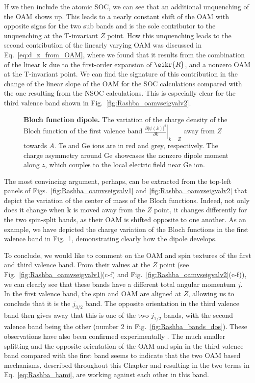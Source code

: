If we then include the atomic \gls{SOC}, we can see that an additional unquenching of the \gls{OAM} shows up.
This leads to a nearly constant shift of the \gls{OAM} with opposite signs for the two sub bands and is the sole contributor to the unquenching at the \gls{T}-invariant $Z$ point.
How this unquenching leads to the second contribution of the linearly varying \gls{OAM} was discussed in Eq.~\eqref{eq:d_z_from_OAM}, where we found that it results from the combination of the linear $\bm k$ due to the first-order expansion of $\eikr{R}$, and a nonzero \gls{OAM} at the \gls{T}-invariant point.
We can find the signature of this contribution in the change of the linear slope of the \gls{OAM} for the \gls{SOC} calculations compared with the one resulting from the \gls{NSOC} calculations.
This is especially clear for the third valence band shown in Fig.~\ref{fig:Rashba_oamvseigvalv2}.
\begin{figure}
	\centering
{}
\caption{\label{fig:Rashba_diffdens}{\bf Bloch function dipole.} The variation of the charge density of the Bloch function of the first valence band $\left.\frac{\partial |\psi(k)|^2}{\partial k}\right\rvert_{k=Z}$ away from $Z$ towards $A$. Te and Ge ions are in red and grey, respectively. The charge asymmetry around Ge showcases the nonzero dipole moment along $z$, which couples to the local electric field near Ge ion.}
\end{figure}
    
The most convincing argument, perhaps, can be extracted from the top-left panels of Figs.~\ref{fig:Rashba_oamvseigvalv1} and \ref{fig:Rashba_oamvseigvalv2} that depict the variation of the center of mass of the Bloch functions. Indeed, not only does it change when $\bm k$ is moved away from the $Z$ point, it changes differently for the two spin-split bands, as their \gls{OAM} is shifted opposite to one another.
As an example,  we have depicted the charge variation of the Bloch functions in the first valence band in Fig.~\ref{fig:Rashba_diffdens}, demonstrating clearly how the dipole develops.
    
To conclude, we would like to comment on the \gls{OAM} and spin textures of the first and third valence band.
From their values at the $Z$ point (see Fig.~\ref{fig:Rashba_oamvseigvalv1}(c-f) and Fig.~\ref{fig:Rashba_oamvseigvalv2}(c-f)), we can clearly see that these bands have a different total angular momentum $j$.
In the first valence band, the spin and \gls{OAM} are aligned at $Z$, allowing us to conclude that it is the $j_{3/2}$ band. The opposite orientation in the third valence band then gives away that this is one of the two $j_{1/2}$ bands, with the second valence band being the other (number 2 in Fig.~\ref{fig:Rashba_bands_dos}).
These observations have also been confirmed experimentally \cite{Krempasky2015,Krempasky2020}.
The much smaller splitting and the opposite orientation of the \gls{OAM} and spin in the third valence band compared with the first band seems to indicate that the two \gls{OAM} based mechanisms, described throughout this Chapter and resulting in the two terms in Eq.~\eqref{eq:Rashba_hami}, are working against each other in this band.

